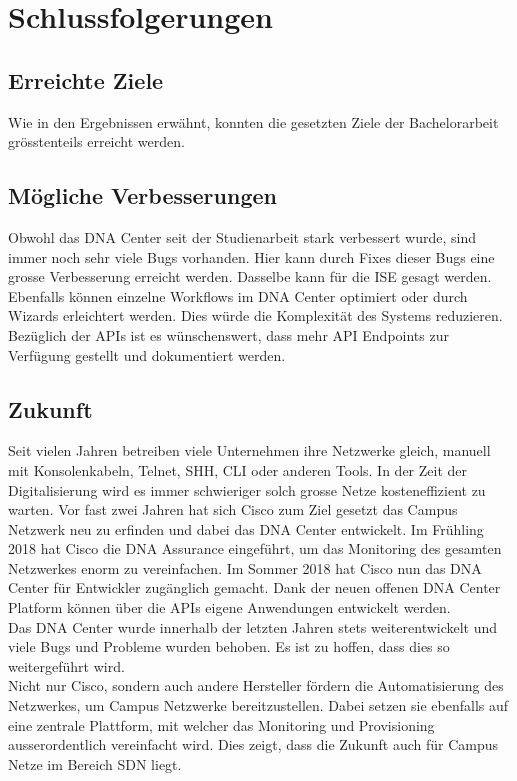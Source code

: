 \section{Schlussfolgerungen}

\subsection{Erreichte Ziele}
Wie in den Ergebnissen erwähnt, konnten die gesetzten Ziele der Bachelorarbeit grösstenteils erreicht werden.   

 
\subsection{Mögliche Verbesserungen}
Obwohl das DNA Center seit der Studienarbeit stark verbessert wurde, sind immer noch sehr viele Bugs vorhanden. Hier kann durch Fixes dieser Bugs eine grosse Verbesserung erreicht werden. Dasselbe kann für die ISE gesagt werden. Ebenfalls können einzelne Workflows im DNA Center optimiert oder durch Wizards erleichtert werden. Dies würde die Komplexität des Systems reduzieren. Bezüglich der APIs ist es wünschenswert, dass mehr API Endpoints zur Verfügung gestellt und dokumentiert werden.

 \subsection{Zukunft}
Seit vielen Jahren betreiben viele Unternehmen ihre Netzwerke gleich, manuell mit Konsolenkabeln, Telnet, SHH, CLI oder anderen Tools. In der Zeit der Digitalisierung wird es immer schwieriger solch grosse Netze kosteneffizient zu warten. Vor fast zwei Jahren hat sich Cisco zum Ziel gesetzt das Campus Netzwerk neu zu erfinden und dabei das DNA Center entwickelt. Im Frühling 2018 hat Cisco die DNA Assurance eingeführt, um das Monitoring des gesamten Netzwerkes enorm zu vereinfachen. Im Sommer 2018 hat Cisco nun das DNA Center für Entwickler zugänglich gemacht. Dank der neuen offenen DNA Center Platform können über die APIs eigene Anwendungen entwickelt werden.\\

Das DNA Center wurde innerhalb der letzten Jahren stets weiterentwickelt und viele Bugs und Probleme wurden behoben. Es ist zu hoffen, dass dies so weitergeführt wird. \\

Nicht nur Cisco, sondern auch andere Hersteller fördern die Automatisierung des Netzwerkes, um Campus Netzwerke bereitzustellen. Dabei setzen sie ebenfalls auf eine zentrale Plattform, mit welcher das Monitoring und Provisioning ausserordentlich vereinfacht wird. Dies zeigt, dass die Zukunft auch für Campus Netze im Bereich SDN liegt.
